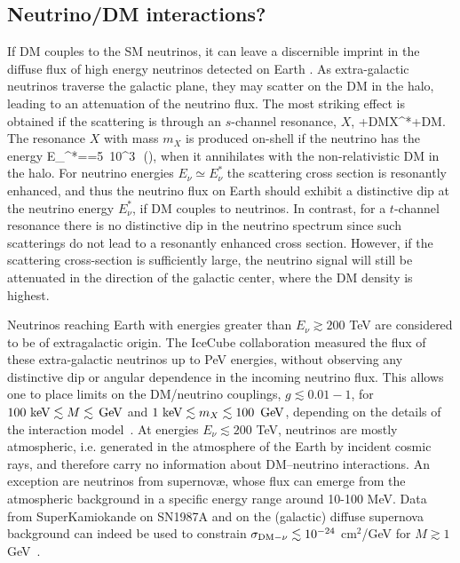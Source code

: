 \subsection{Neutrino/DM interactions?}
\label{sec:neutrinoDMinteractions}
If DM couples to the SM neutrinos, it can leave a discernible imprint in the diffuse flux of high energy neutrinos detected on Earth \cite{DM:nu:interactions}. As extra-galactic neutrinos traverse the galactic plane, they may scatter on the DM in the halo, leading to an attenuation of the neutrino flux.  The most striking effect is obtained if the scattering is through an $s$-channel resonance, $X$, 
\beq
\nu +{\rm DM}\to X^{*}\to \nu +{\rm DM}.
\eeq
The resonance $X$ with mass $m_X$ is produced on-shell if the neutrino has the energy 
\beq
E_\nu^*==5\, 10^3\, \,\biggr(\biggr),
\eeq
when it annihilates with the non-relativistic DM in the halo. For neutrino energies $E_\nu\simeq E_\nu^*$ the scattering cross section is resonantly enhanced, and thus the neutrino flux on Earth should exhibit a distinctive dip at the neutrino energy $E_\nu^*$, if DM couples to neutrinos. In contrast, for a $t$-channel resonance there is no distinctive dip in the neutrino spectrum since such scatterings do not lead to a resonantly enhanced cross section. 
 However, if the scattering cross-section is sufficiently large, the neutrino signal will still be attenuated in the direction of the galactic center, where the DM density is highest.

\smallskip

Neutrinos reaching Earth with energies greater than $E_\nu\gtrsim 200$ TeV are considered to be of extragalactic origin. 
The {\sc IceCube} collaboration measured the flux of these extra-galactic neutrinos up to PeV energies,
without observing any distinctive dip or angular dependence in the incoming neutrino flux.  
This allows one to place limits on the DM/neutrino couplings, $g\lesssim 0.01-1$, for 
$100\ \text{keV} \lesssim M\lesssim \,{\rm GeV}$  and  
$1\ \text{keV} \lesssim m_X  \lesssim 100\ \,{\rm GeV}$, 
depending on the details of the interaction model~\cite{DM:nu:interactions}. 
At energies $E_\nu\lesssim 200$ TeV, neutrinos are mostly atmospheric, i.e. generated in the atmosphere of the Earth by incident cosmic rays, and therefore carry no information about DM--neutrino interactions. An exception are neutrinos from supernov\ae, whose flux can emerge from the atmospheric background in a specific energy range around 10-100 MeV. Data from {\sc SuperKamiokande} on SN1987A and on the (galactic) diffuse supernova background can indeed be used to constrain $\sigma_{{\rm DM}-\nu} \lesssim 10^{-24}$ cm$^2$/GeV for $M\gtrsim 1$ GeV~\cite{DM:nu:interactions}.

